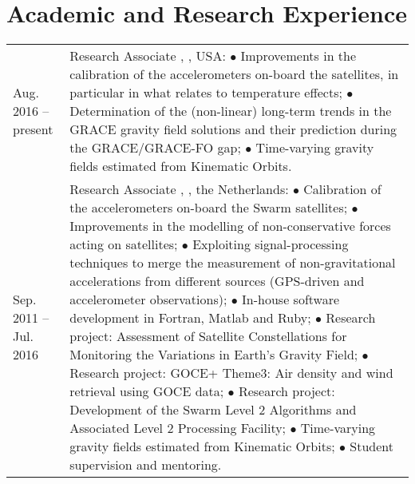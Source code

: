\documentclass[a4paper]{article}
\newcommand{\dynhref}[2]{%
  \iftoggle{expliciturl}{%
    #2 (\href{#1}{\texttt{\detokenize{#1}}})%
  }{%
    \href{#1}{#2}%
  }%
}
\newlength{\listskipbig}
\newenvironment{cvsection}[2]{
  \setlength{\floatsep}{0pt}
  \setlength{\textfloatsep}{0pt}
  \setlength{\intextsep}{0pt}
  \section*{#1}
  \begin{longtable}{lp{#2}}
}{
  \end{longtable}
}
\begin{document}

\begin{cvsection}{Academic and Research Experience}{11.0cm}

Aug. 2016 -- present
  & Research Associate\newline
    \dynhref{http://www.csr.utexas.edu}{Center for Space Research}, \dynhref{http://www.utexas.edu}{Texas University at Austin}, USA:\newline
    $\bullet$ Improvements in the calibration of the accelerometers on-board the \dynhref{http://www.csr.utexas.edu/grace/}{GRACE} satellites, in particular in what relates to temperature effects;\newline
    $\bullet$ Determination of the (non-linear) long-term trends in the GRACE gravity field solutions and their prediction during the GRACE/GRACE-FO gap;\newline
    $\bullet$ Time-varying gravity fields estimated from Kinematic Orbits.
    \\[\listskipbig]

Sep. 2011 -- Jul. 2016
  & Research Associate\newline
    \dynhref{http://www.as.lr.tudelft.nl}{Astrodynamics and Space Missions}, \dynhref{http://www.tudelft.nl/}{Delft University of Technology}, the Netherlands:\newline
    $\bullet$ Calibration of the accelerometers on-board the Swarm satellites;\newline
    $\bullet$ Improvements in the modelling of non-conservative forces acting on satellites;\newline
    $\bullet$ Exploiting signal-processing techniques to merge the measurement of non-gravitational accelerations from different sources (GPS-driven and accelerometer observations);\newline
    $\bullet$ In-house software development in Fortran, Matlab and Ruby;\newline
    $\bullet$ Research project: Assessment of Satellite Constellations for Monitoring the Variations in Earth's Gravity Field;\newline
    $\bullet$ Research project: GOCE+ Theme3: Air density and wind retrieval using GOCE data;\newline
    $\bullet$ Research project: Development of the Swarm Level 2 Algorithms and Associated Level 2 Processing Facility;\newline
    $\bullet$ Time-varying gravity fields estimated from Kinematic Orbits;\newline
    $\bullet$ Student supervision and mentoring.
    \\[\listskipbig]


\end{cvsection}
\end{document}

